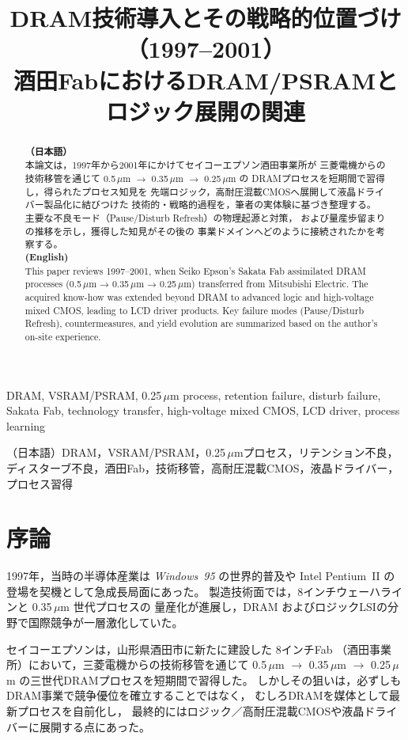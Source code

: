 \documentclass[conference]{IEEEtran}
\title{DRAM技術導入とその戦略的位置づけ（1997--2001）\\
\large 酒田FabにおけるDRAM/PSRAMとロジック展開の関連}
\author{%
  \IEEEauthorblockN{三溝 真一 (Shinichi Samizo)}%
  \IEEEauthorblockA{独立系半導体研究者（元セイコーエプソン）\\%
  Independent Semiconductor Researcher (ex-Seiko Epson)\\%
  Email: \href{mailto:shin3t72@gmail.com}{shin3t72@gmail.com}\\%
  GitHub: \url{https://github.com/Samizo-AITL}}%
}
\begin{document}
\maketitle

\begin{abstract}
\textbf{（日本語）}\\
本論文は，1997年から2001年にかけてセイコーエプソン酒田事業所が
三菱電機からの技術移管を通じて \mbox{0.5\,$\mu$m} $\rightarrow$ \mbox{0.35\,$\mu$m} $\rightarrow$ \mbox{0.25\,$\mu$m} の
DRAMプロセスを短期間で習得し，得られたプロセス知見を
先端ロジック，高耐圧混載CMOSへ展開して液晶ドライバー製品化に結びつけた
技術的・戦略的過程を，筆者の実体験に基づき整理する。
主要な不良モード（Pause/Disturb Refresh）の物理起源と対策，
および量産歩留まりの推移を示し，獲得した知見がその後の
事業ドメインへどのように接続されたかを考察する。\\[1ex]

\textbf{(English)}\\
This paper reviews 1997–2001, when Seiko Epson’s Sakata Fab
assimilated DRAM processes (0.5\,$\mu$m → 0.35\,$\mu$m → 0.25\,$\mu$m) transferred from Mitsubishi Electric.
The acquired know-how was extended beyond DRAM to advanced logic
and high-voltage mixed CMOS, leading to LCD driver products.
Key failure modes (Pause/Disturb Refresh), countermeasures, and yield evolution
are summarized based on the author’s on-site experience.
\end{abstract}

\begin{IEEEkeywords}
DRAM, VSRAM/PSRAM, 0.25\,$\mu$m process, retention failure, disturb failure, Sakata Fab, technology transfer, high-voltage mixed CMOS, LCD driver, process learning

\hspace{1em}（日本語）DRAM，VSRAM/PSRAM，0.25\,$\mu$mプロセス，リテンション不良，ディスターブ不良，酒田Fab，技術移管，高耐圧混載CMOS，液晶ドライバー，プロセス習得
\end{IEEEkeywords}

\section{序論}
1997年，当時の半導体産業は \textit{Windows~95} の世界的普及や
Intel Pentium~II の登場を契機として急成長局面にあった。
製造技術面では，8インチウェーハラインと 0.35\,$\mu$m 世代プロセスの
量産化が進展し，DRAM およびロジックLSIの分野で国際競争が一層激化していた。

セイコーエプソンは，山形県酒田市に新たに建設した 8インチFab
（酒田事業所）において，三菱電機からの技術移管を通じて
0.5\,$\mu$m $\rightarrow$ 0.35\,$\mu$m $\rightarrow$ 0.25\,$\mu$m
の三世代DRAMプロセスを短期間で習得した。
しかしその狙いは，必ずしもDRAM事業で競争優位を確立することではなく，
むしろDRAMを媒体として最新プロセスを自前化し，
最終的にはロジック／高耐圧混載CMOSや液晶ドライバーに展開する点にあった。
\end{document}
